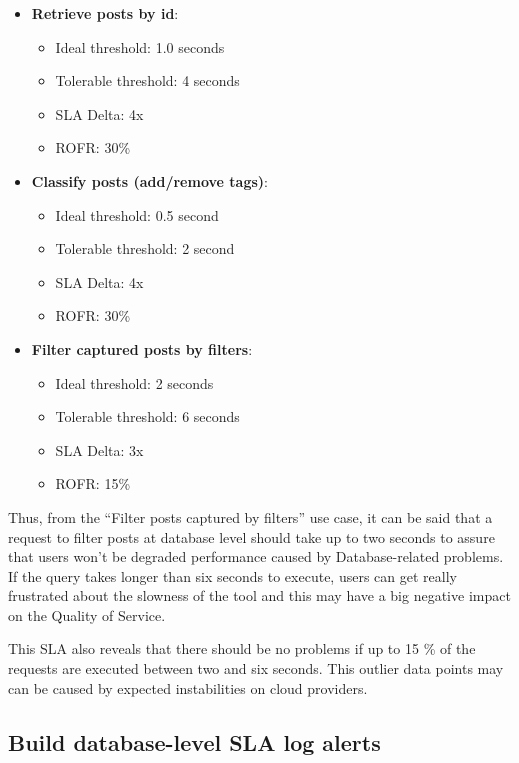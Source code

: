 \begin{itemize}
\item{
\textbf{Retrieve posts by id}:
	\begin{itemize}
		\item{Ideal threshold: 1.0 seconds}
		\item{Tolerable threshold: 4 seconds}
		\item{SLA Delta: 4x}
		\item{ROFR: 30\%}
	\end{itemize}
}
\item{

\textbf{Classify posts (add/remove tags)}:
	\begin{itemize}
		\item{Ideal threshold: 0.5 second}
		\item{Tolerable threshold: 2 second}
		\item{SLA Delta: 4x}
		\item{ROFR: 30\%}
	\end{itemize}
}

\item{
	\textbf{Filter captured posts by filters}:
	\begin{itemize}
		\item{Ideal threshold: 2 seconds}
		\item{Tolerable threshold: 6 seconds}
		\item{SLA Delta: 3x}
		\item{ROFR: 15\%}
	\end{itemize}
}
\end{itemize}

Thus, from the ``Filter posts captured by filters'' use case, it can be said that a request to filter posts at database level should take up to two seconds to assure that users won't be degraded performance caused by Database-related problems. If the query takes longer than six seconds to execute, users can get really frustrated about the slowness of the tool and this may have a big negative impact on the Quality of Service. 

This SLA also reveals that there should be no problems if up to 15 \% of the requests are executed between two and six seconds. This outlier data points may can be caused by expected instabilities on cloud providers. 


\subsection{Build database-level SLA log alerts}

